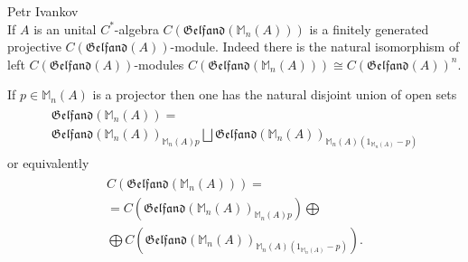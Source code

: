 \documentclass{beamer}
\theoremstyle{plain}
\newcommand{\bean}{\begin{eqnarray*}}
\newcommand{\eean}{\end{eqnarray*}}
\begin{document}
\begin{frame}
\begin{lemma}\alert{Petr Ivankov}\\
If $A$ is an unital $C^*$-algebra $C\left( \mathfrak{Gelfand}\left(\mathbb{M}_n\left(A \right)\right) \right)$ is a finitely generated projective 	$C\left( \mathfrak{Gelfand}\left(A \right)\right)$-module. Indeed there is the natural isomorphism of left $C\left( \mathfrak{Gelfand}\left(A\right)\right)$-modules $C\left( \mathfrak{Gelfand}\left(\mathbb{M}_n\left(A \right)\right)\right) \cong C\left( \mathfrak{Gelfand}\left(A\right)\right) ^n$.
\end{lemma}
If  
$p \in \mathbb{M}_n\left(A \right)$ is a projector then one has the natural disjoint union of open sets
\bean\label{matrppbu_eqn}
\begin{split}
	\mathfrak{Gelfand}\left(\mathbb{M}_n\left(A \right)\right)=\\ \mathfrak{Gelfand}\left(\mathbb{M}_n\left(A \right)\right)_{\mathbb{M}_n\left(A \right)p}\bigsqcup \mathfrak{Gelfand}\left(\mathbb{M}_n\left(A \right)\right)_{\mathbb{M}_n\left(A \right)\left(1_{\mathbb{M}_n\left(A \right)} -p\right) }
\end{split}
\eean
or equivalently
\bean
\begin{split}
	C\left( \mathfrak{Gelfand}\left(\mathbb{M}_n\left(A \right)\right)\right)=\\=	C\left( \mathfrak{Gelfand}\left(\mathbb{M}_n\left(A \right)\right)_{\mathbb{M}_n\left(A \right)p} \right)\bigoplus\\\bigoplus  C\left(  \mathfrak{Gelfand}\left(\mathbb{M}_n\left(A \right)\right)_{\mathbb{M}_n\left(A \right)\left(1_{\mathbb{M}_n\left(A \right)} -p\right) }\right).  
\end{split}
\eean

\end{frame}
\end{document}
